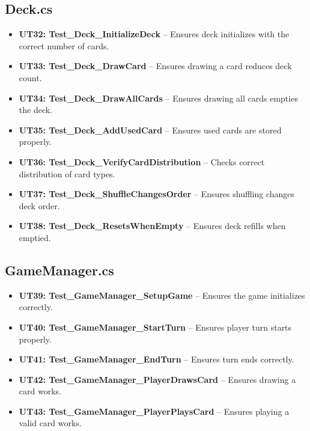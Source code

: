 \documentclass[12pt, titlepage]{article}
\begin{document}
\subsection{Deck.cs}
\begin{itemize}
    \item \textbf{UT32: Test\_Deck\_InitializeDeck} -- Ensures deck initializes with the correct number of cards.
    \item \textbf{UT33: Test\_Deck\_DrawCard} -- Ensures drawing a card reduces deck count.
    \item \textbf{UT34: Test\_Deck\_DrawAllCards} -- Ensures drawing all cards empties the deck.
    \item \textbf{UT35: Test\_Deck\_AddUsedCard} -- Ensures used cards are stored properly.
    \item \textbf{UT36: Test\_Deck\_VerifyCardDistribution} -- Checks correct distribution of card types.
    \item \textbf{UT37: Test\_Deck\_ShuffleChangesOrder} -- Ensures shuffling changes deck order.
    \item \textbf{UT38: Test\_Deck\_ResetsWhenEmpty} -- Ensures deck refills when emptied.
\end{itemize}

\subsection{GameManager.cs}
\begin{itemize}
    \item \textbf{UT39: Test\_GameManager\_SetupGame} -- Ensures the game initializes correctly.
    \item \textbf{UT40: Test\_GameManager\_StartTurn} -- Ensures player turn starts properly.
    \item \textbf{UT41: Test\_GameManager\_EndTurn} -- Ensures turn ends correctly.
    \item \textbf{UT42: Test\_GameManager\_PlayerDrawsCard} -- Ensures drawing a card works.
    \item \textbf{UT43: Test\_GameManager\_PlayerPlaysCard} -- Ensures playing a valid card works.
\end{itemize}
\end{document}
